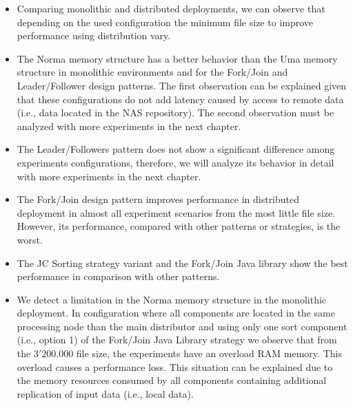 \begin{itemize}
	\item Comparing monolithic and distributed deployments, we can observe that depending on the used configuration the minimum file size to improve performance using distribution vary.
	\item The Norma memory structure has a better behavior than the Uma memory structure in monolithic environments and for the Fork/Join and Leader/Follower design patterns. The first observation can be explained given that these configurations do not add latency caused by access to remote data (i.e., data located in the NAS repository). The second observation must be analyzed with more experiments in the next chapter.
	\item The Leader/Followers pattern does not show a significant difference among experiments configurations, therefore, we will analyze its behavior in detail with more experiments in the next chapter.
	\item The Fork/Join design pattern improves performance in distributed deployment in almost all experiment scenarios from the most little file size. However, its performance, compared with other patterns or strategies, is the worst.
	\item The JC Sorting strategy variant and the Fork/Join Java library show the best performance in comparison with other patterns.
	\item We detect a limitation in the Norma memory structure in the monolithic deployment. In configuration where all components are located in the same processing node than the main distributor and using only one sort component (i.e., option 1) of the Fork/Join Java Library strategy we observe that from the $3'200.000$ file size, the experiments have an overload RAM memory. This overload causes a performance loss. This situation can be explained due to the memory resources consumed by all components containing additional replication of input data (i.e., local data).
\end{itemize}

